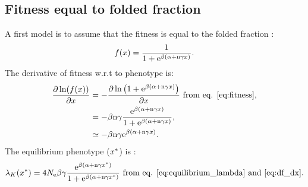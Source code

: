 \documentclass{article}
\begin{document}
\subsection{Fitness equal to folded fraction}
A first model is to assume that the fitness is equal to the folded fraction \cite{Goldstein2013}:
\begin{gather}
f(x) = \frac{1}{1 + \mathrm{e}^{\beta(\alpha + \text{n} \gamma x)}}. \label{eq:fitness}
\end{gather}
The derivative of fitness w.r.t to phenotype is:
\begin{align}
\frac{\partial \ln (f(x))}{\partial x}  & = - \frac{\partial \ln \left( 1 + \mathrm{e}^{\beta(\alpha + \text{n} \gamma x)} \right)}{\partial x} \text{ from eq. \ref{eq:fitness}}, \\
& = - \beta \text{n} \gamma \frac{\mathrm{e}^{\beta(\alpha + \text{n} \gamma x)}}{1 + \mathrm{e}^{\beta(\alpha + \text{n} \gamma x)}} \label{eq:df_dx},\\
& \simeq - \beta \text{n} \gamma \mathrm{e}^{\beta(\alpha + \text{n} \gamma x)}.
\end{align}
The equilibrium phenotype ($x^{*}$) is :
\begin{gather}
\lambda_{K}(x^{*}) = 4N_{\mathrm{e}} \beta \gamma \frac{\mathrm{e}^{\beta(\alpha + \text{n} \gamma x^{*})}}{1 + \mathrm{e}^{\beta(\alpha + \text{n} \gamma x^{*})}}  \text{ from eq. \ref{eq:equilibrium_lambda} and \ref{eq:df_dx}}.
\end{gather}
\end{document}
